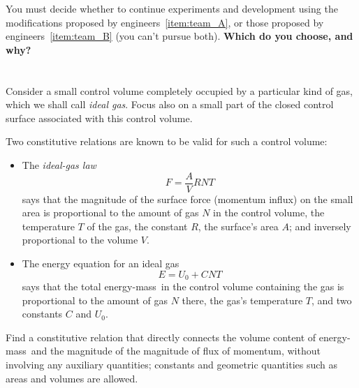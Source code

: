 \documentclass[a4paper,12pt,%
onecolumn,oneside,%
british%
]{memoir}
\renewcommand*{\|}[1][]{\nonscript\:#1\vert\nonscript\:\mathopen{}}
\newcommand*{\energym}{energy-mass}
\newcommand*{\yN}{N}
\newcommand*{\yE}{E}
\newcommand*{\yU}{U}
\newcommand*{\yT}{T}%
\begin{document}
You must decide whether to continue experiments and development using the modifications proposed by engineers~\ref{item:team_A}, or those proposed by engineers~\ref{item:team_B} (you can't pursue both). \textbf{Which do you choose, and why?}


\section{}
\label{sec:ideal_gas_const}
Consider a small control volume completely occupied by a particular kind of gas, which we shall call \emph{ideal gas}. Focus also on a small part of the closed control surface associated with this control volume.

Two constitutive relations are known to be valid for such a control volume:
\begin{itemize}
\item The \emph{ideal-gas law}
  \begin{equation*}
    F = \frac{A}{V} R \yN \yT
  \end{equation*}
says that the magnitude of the surface force (momentum influx) on the small area is proportional to the amount of gas $\yN$ in the control volume, the temperature $\yT$ of the gas, the constant $R$, the surface's area $A$; and inversely proportional to the volume $V$.

\item The energy equation for an ideal gas
  \begin{equation*}
    \yE = \yU_{0} + C \yN \yT
  \end{equation*}
  says that the total \energym\ in the control volume containing the gas is proportional to the amount of gas $\yN$ there, the gas's temperature $\yT$, and two constants $C$ and $\yU_{0}$.
\end{itemize}

Find a constitutive relation that directly connects the volume content of \energym\ and the magnitude of the magnitude of flux of momentum, without involving any auxiliary quantities; constants and geometric quantities such as areas and volumes are allowed.



\section{}
\label{sec:constants_previous}
\end{document}
